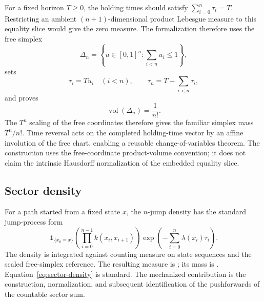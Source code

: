For a fixed horizon $T\ge 0$, the holding times should satisfy $\sum_{i=0}^{n}\tau_i=T$. Restricting an ambient $(n+1)$-dimensional product Lebesgue measure to this equality slice would give the zero measure. The formalization therefore uses the free simplex
\[
  \Delta_n=\left\{u\in[0,1]^n:\sum_{i<n}u_i\le 1\right\},
\]
sets
\[
  \tau_i=T u_i \quad (i<n),
  \qquad
  \tau_n=T-\sum_{i<n}\tau_i,
\]
and proves
\[
  \operatorname{vol}(\Delta_n)=\frac{1}{n!}.
\]
The $T^n$ scaling of the free coordinates therefore gives the familiar simplex mass $T^n/n!$. Time reversal acts on the completed holding-time vector by an affine involution of the free chart, enabling a reusable change-of-variables theorem. The construction uses the free-coordinate product-volume convention; it does not claim the intrinsic Hausdorff normalization of the embedded equality slice.

\subsection{Sector density}

For a path started from a fixed state $x$, the $n$-jump density has the standard jump-process form
\begin{equation}
\label{eq:sector-density}
  \mathbf{1}_{\{x_0=x\}}
  \left(\prod_{i=0}^{n-1} k(x_i,x_{i+1})\right)
  \exp\left(-\sum_{i=0}^{n}\lambda(x_i)\tau_i\right).
\end{equation}
The density is integrated against counting measure on state sequences and the scaled free-simplex reference. The resulting measure is ; its mass is . Equation~\eqref{eq:sector-density} is standard. The mechanized contribution is the construction, normalization, and subsequent identification of the pushforwards of the countable sector sum.

